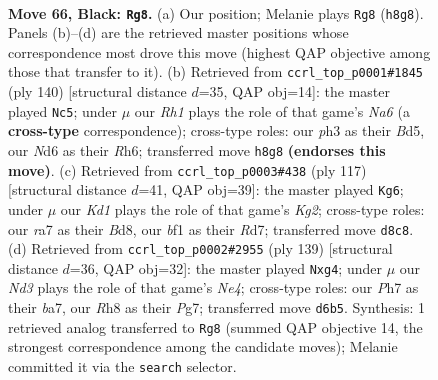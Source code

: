 \documentclass[11pt]{article}
\begin{document}
\clearpage

\begin{figure}[p]\centering
\begin{subfigure}{0.46\textwidth}\centering
\resizebox{\linewidth}{!}{%
\newchessgame
\chessboard[
  setfen={3k3r/R6p/P2n4/8/2P5/2p2K1P/2P3P1/5B2 b - - 2 66},
  showmover=false,
  pgfstyle=straightmove, color=movearrow, markmove={h8-g8}
]}
\caption{}
\end{subfigure}\hfill
\begin{subfigure}{0.46\textwidth}\centering
\resizebox{\linewidth}{!}{%
\newchessgame
\chessboard[
  setfen={8/3bk3/N6R/1p1Bp3/4P1p1/6rp/8/7K w - - 0 71},
  showmover=false,
  pgfstyle=straightmove, color=movearrow, markmove={a6-c5}
]}
\caption{}
\end{subfigure}
\\[4pt]
\begin{subfigure}{0.46\textwidth}\centering
\resizebox{\linewidth}{!}{%
\newchessgame
\chessboard[
  setfen={3b4/1p1r1pk1/8/P4R1p/5P2/6P1/5B1K/8 b - - 0 59},
  showmover=false,
  pgfstyle=straightmove, color=movearrow, markmove={g7-g6}
]}
\caption{}
\end{subfigure}\hfill
\begin{subfigure}{0.46\textwidth}\centering
\resizebox{\linewidth}{!}{%
\newchessgame
\chessboard[
  setfen={8/B5pk/R7/4n3/p1r3P1/6P1/5PK1/8 b - - 2 70},
  showmover=false,
  pgfstyle=straightmove, color=movearrow, markmove={e5-g4}
]}
\caption{}
\end{subfigure}
\caption{\textbf{Move 66, Black: \texttt{Rg8}.} (a) Our position; Melanie plays \texttt{Rg8} (\texttt{h8g8}). Panels (b)--(d) are the retrieved master positions whose correspondence most drove this move (highest QAP objective among those that transfer to it). (b) Retrieved from \texttt{ccrl\_top\_p0001\#1845} (ply 140) [structural distance $d$=35, QAP obj=14]: the master played \texttt{Nc5}; under $\mu$ our \emph{Rh1} plays the role of that game's \emph{Na6} (a \textbf{cross-type} correspondence); cross-type roles: our \emph{p}h3 as their \emph{B}d5, our \emph{N}d6 as their \emph{R}h6; transferred move \texttt{h8g8} \textbf{(endorses this move)}. (c) Retrieved from \texttt{ccrl\_top\_p0003\#438} (ply 117) [structural distance $d$=41, QAP obj=39]: the master played \texttt{Kg6}; under $\mu$ our \emph{Kd1} plays the role of that game's \emph{Kg2}; cross-type roles: our \emph{r}a7 as their \emph{B}d8, our \emph{b}f1 as their \emph{R}d7; transferred move \texttt{d8c8}. (d) Retrieved from \texttt{ccrl\_top\_p0002\#2955} (ply 139) [structural distance $d$=36, QAP obj=32]: the master played \texttt{Nxg4}; under $\mu$ our \emph{Nd3} plays the role of that game's \emph{Ne4}; cross-type roles: our \emph{P}h7 as their \emph{b}a7, our \emph{R}h8 as their \emph{P}g7; transferred move \texttt{d6b5}. Synthesis: 1 retrieved analog transferred to \texttt{Rg8} (summed QAP objective 14, the strongest correspondence among the candidate moves); Melanie committed it via the \texttt{search} selector.}
\label{fig:thought-m131}
\end{figure}
\end{document}
